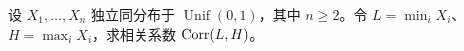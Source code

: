 设 $X_1,\ldots,X_n$ 独立同分布于 $\operatorname{Unif}(0,1)$，其中 $n\ge2$。令 $L=\min_iX_i$、$H=\max_iX_i$，求相关系数 $\operatorname{Corr}(L,H)$。
